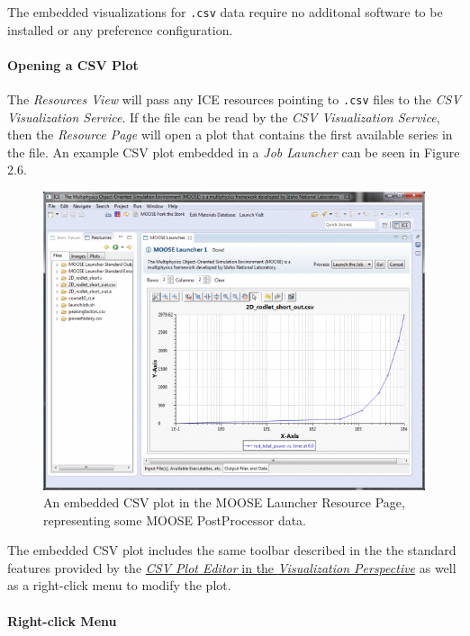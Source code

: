 The embedded visualizations for \texttt{.csv} data require no additonal
software to be installed or any preference configuration.

\paragraph{Opening a CSV Plot}\label{opening-a-csv-plot}

The \emph{Resources View} will pass any ICE resources pointing to
\texttt{.csv} files to the \emph{CSV Visualization Service}. If the file
can be read by the \emph{CSV Visualization Service}, then the
\emph{Resource Page} will open a plot that contains the first available
series in the file.
An example CSV plot embedded in a \emph{Job Launcher} can be seen in Figure 2.6.

\begin{figure}[htbp]
\centering
\includegraphics[width=\textwidth]{figures/ICE_Viz_CSV.png}
\caption{An embedded CSV plot in the MOOSE Launcher Resource Page, representing some MOOSE PostProcessor data.}
\end{figure}

The embedded CSV plot includes the same toolbar described in the the
standard features provided by the
\href{Visualizing_Output_with_ICE\#Plot_Toolbar}{\emph{CSV Plot Editor}
in the \emph{Visualization Perspective}} as well as a right-click menu
to modify the plot.

\paragraph{Right-click Menu}\label{right-click-menu-1}


